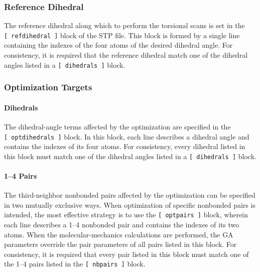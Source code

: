 \documentclass[10pt,a4paper]{report}
\numberwithin{equation}{section}
\begin{document}
\subsubsection{Reference Dihedral}
\label{sec:stp-ref_dihedral}

The reference dihedral along which to perform the torsional scans is
set in the \texttt{[~refdihedral~]} block of the STP file. This block
is formed by a single line containing the indexes of the four atoms of
the desired dihedral angle. For consistency, it is required that the
reference dihedral match one of the dihedral angles listed in a
\texttt{[~dihedrals~]} block.

\subsubsection{Optimization Targets}
\label{sec:stp-optterms}

\paragraph{Dihedrals}

The dihedral-angle terms affected by the optimization are specified in the \texttt{[~optdihedrals~]} block.
In this block, each line describes a dihedral angle and contains the indexes of its four atoms.
For consistency, every dihedral listed in this block must match one of the dihedral angles listed in a \texttt{[~dihedrals~]} block. 


\paragraph{1--4 Pairs}

The third-neighbor nonbonded pairs affected by the optimization can be specified in two mutually exclusive ways.
When optimization of specific nonbonded pairs is intended, the most effective strategy is to use the \texttt{[~optpairs~]} block, wherein each line describes a 1--4 nonbonded pair and contains the indexes of its two atoms.
When the molecular-mechanics calculations are performed, the GA parameters override the pair parameters of all pairs listed in this block.
For consistency, it is required that every pair listed in this block must match one of the 1--4 pairs listed in the \texttt{[~nbpairs~]} block.
\end{document}
